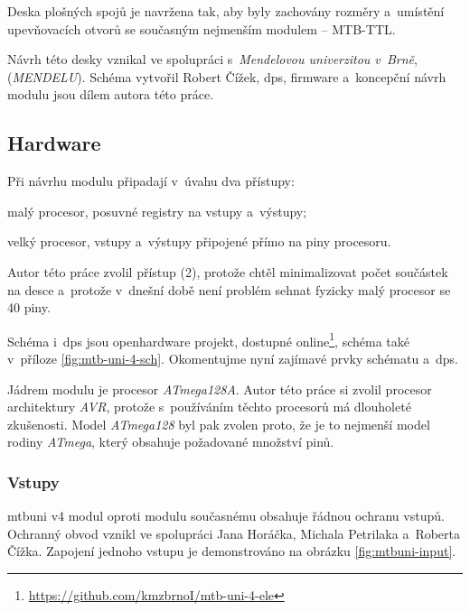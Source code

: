 Deska plošných spojů je navržena tak, aby byly zachovány rozměry a~umístění
upevňovacích otvorů se současným nejmenším modulem – MTB-TTL.

Návrh této desky vznikal ve spolupráci s~\textit{Mendelovou univerzitou
v~Brně}, (\textit{MENDELU}). Schéma vytvořil Robert Čížek, \gls{dps},
firmware a~koncepční návrh modulu jsou dílem autora této práce.


\subsection{Hardware}

Při návrhu modulu připadají v~úvahu dva přístupy:

\begin{compactenum}
\item malý procesor, posuvné registry na vstupy a~výstupy;
\item velký procesor, vstupy a~výstupy připojené přímo na piny procesoru.
\end{compactenum}

Autor této práce zvolil přístup (2), protože chtěl minimalizovat počet
součástek na desce a~protože v~dnešní době není problém sehnat fyzicky malý
procesor se 40 piny.

Schéma i~\gls{dps} jsou openhardware projekt, dostupné
online\footnote{\url{https://github.com/kmzbrnoI/mtb-uni-4-ele}}, schéma také v~příloze
\ref{fig:mtb-uni-4-sch}. Okomentujme nyní zajímavé prvky schématu a~\gls{dps}.

Jádrem modulu je procesor \textit{ATmega128A}. Autor této práce si zvolil
procesor architektury \textit{AVR}, protože s~používáním těchto procesorů má
dlouholeté zkušenosti. Model \textit{ATmega128} byl pak zvolen proto, že je to
nejmenší model rodiny \textit{ATmega}, který obsahuje požadované množství pinů.

\subsubsection{Vstupy}

\gls{mtbuni} v4 modul oproti modulu současnému obsahuje řádnou ochranu vstupů.
Ochranný obvod vznikl ve spolupráci Jana Horáčka, Michala Petrilaka a~Roberta
Čížka. Zapojení jednoho vstupu je demonstrováno na obrázku \ref{fig:mtbuni-input}.

